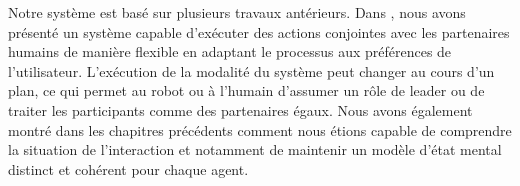 \documentclass[a4paper,11pt,twoside]{StyleThese}
\begin{document}
Notre système est basé sur plusieurs travaux antérieurs. Dans \cite{fioreiser2014}, nous avons présenté un système capable d'exécuter des actions conjointes avec les partenaires humains de manière flexible en adaptant le processus aux préférences de l'utilisateur. L'exécution de la modalité du système peut changer au cours d'un plan, ce qui permet au robot ou à l'humain d'assumer un rôle de leader ou de traiter les participants comme des partenaires égaux. Nous avons également montré dans les chapitres précédents comment nous étions capable de comprendre la situation de l'interaction et notamment de maintenir un modèle d'état mental distinct et cohérent pour chaque agent.



\end{document}
